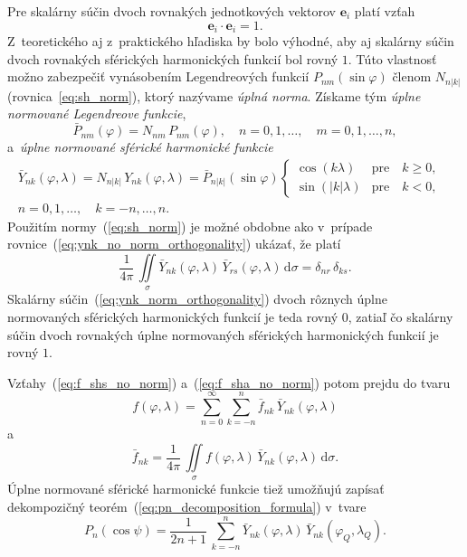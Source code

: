 \documentclass[a4paper,12pt]{book}
\newcommand{\diff}{\mathrm d}
\let\vec\mathbf
\begin{document}
Pre skalárny súčin dvoch rovnakých jednotkových vektorov $\vec e_i$ platí vzťah
%
\begin{equation}
\vec e_i \cdot \vec e_i = 1{.}
\end{equation}
%
Z~teoretického aj z~praktického hľadiska by bolo výhodné, aby aj skalárny súčin
dvoch rovnakých sférických harmonických funkcií bol rovný $1$.  Túto vlastnosť
možno zabezpečiť vynásobením Legendreových funkcií $P_{nm}(\sin\varphi)$ členom
$N_{n|k|}$ (rovnica~\ref{eq:sh_norm}), ktorý nazývame \emph{úplná norma}.  
Získame tým \emph{úplne normované Legendreove funkcie},
%
\begin{equation}
\bar{P}_{nm}(\varphi) = N_{nm} \, P_{nm}(\varphi){,} \quad  n = 0, 1, \dots,
\quad m = 0, 1, \dots, n{,}
\end{equation}
%
a~\emph{úplne normované sférické harmonické funkcie}
%
\begin{equation}
\label{eq:ynk_norm}
\begin{split}
\bar{Y}_{nk}(\varphi, \lambda) = N_{n|k|} \, Y_{nk}(\varphi, \lambda)
= \bar{P}_{n|k|}(\sin\varphi)
%
\begin{cases}
\cos(k\lambda)    &\text{pre} \quad k \geq 0{,}\\
\sin(|k|\lambda)  &\text{pre} \quad k < 0{,}
\end{cases}
&
%
\\
n = 0, 1, \dots, \quad k = -n, \dots, n{.}&
\end{split}
\end{equation}
%
Použitím normy~(\ref{eq:sh_norm}) je možné obdobne ako v~prípade
rovnice~(\ref{eq:ynk_no_norm_orthogonality}) ukázať, že platí
%
\begin{equation}
\label{eq:ynk_norm_orthogonality}
\frac{1}{4\pi} \, \iint\limits_{\sigma} \bar{Y}_{nk}(\varphi, \lambda) \,
\bar{Y}_{rs}(\varphi, \lambda) \, \diff \sigma = \delta_{nr} \, \delta_{ks}{.}
\end{equation}
%
Skalárny súčin~(\ref{eq:ynk_norm_orthogonality}) dvoch rôznych úplne
normovaných sférických harmonických funkcií je teda rovný 0, zatiaľ čo skalárny
súčin dvoch rovnakých úplne normovaných sférických harmonických funkcií je
rovný $1$.

Vzťahy~(\ref{eq:f_shs_no_norm}) a~(\ref{eq:f_sha_no_norm}) potom prejdu do
tvaru
%
\begin{equation}
\label{eq:f_shs}
f(\varphi, \lambda) = \sum_{n = 0}^\infty \sum_{k = -n}^n \bar{f}_{nk} \,
\bar{Y}_{nk}(\varphi, \lambda)
\end{equation}
%
a
%
\begin{equation}
\label{eq:f_sha}
\bar{f}_{nk} = \frac{1}{4\pi} \, \iint\limits_{\sigma} f(\varphi, \lambda) \,
\bar{Y}_{nk}(\varphi, \lambda) \, \diff \sigma{.}
\end{equation}
%
Úplne normované sférické harmonické funkcie tiež umožňujú zapísať dekompozičný
teorém~(\ref{eq:pn_decomposition_formula}) v~tvare
\parencite{MoritzPhysicalGeodesy}
%
\begin{equation}
P_n(\cos\psi) = \frac{1}{2n + 1} \, \sum_{k = -n}^n \bar{Y}_{nk}(\varphi,
\lambda) \, \bar{Y}_{nk}(\varphi_Q, \lambda_Q){.}
\end{equation}
\end{document}

